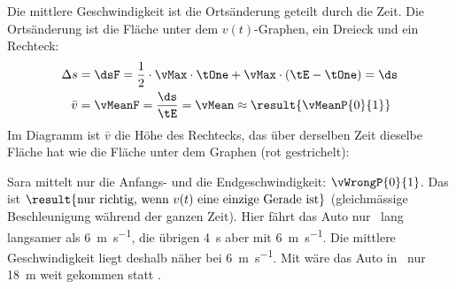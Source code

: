 \begin{abcliste}
\abc Die mittlere Geschwindigkeit ist die Ortsänderung geteilt durch die Zeit. Die Ortsänderung ist die Fläche unter dem $v(t)$-Graphen, ein Dreieck und ein Rechteck:
\begin{align}
 \Delta s &= \dsF = \frac{1}{2}\cdot\vMax\cdot\tOne+\vMax\cdot\left(\tE-\tOne\right) = \ds \\
 \bar v &= \vMeanF = \frac{\ds}{\tE} = \vMean \approx \result{\vMeanP{0}{1}}
\end{align}
Im Diagramm ist $\bar v$ die Höhe des Rechtecks, das über derselben Zeit dieselbe Fläche hat wie die Fläche unter dem Graphen (rot gestrichelt):
\begin{center}
\end{center}
\abc Sara mittelt nur die Anfangs- und die Endgeschwindigkeit: $\vWrongP{0}{1}$. Das ist $\result{\text{nur richtig, wenn } v(t) \text{ eine einzige Gerade ist}}$ (gleichmässige Beschleunigung während der ganzen Zeit). Hier fährt das Auto nur \tOneO\ lang langsamer als \SI{6}{\meter\per\second}, die übrigen \SI{4}{\second} aber mit \SI{6}{\meter\per\second}. Die mittlere Geschwindigkeit liegt deshalb näher bei \SI{6}{\meter\per\second}. Mit  wäre das Auto in \tEO\ nur \SI{18}{\meter} weit gekommen statt .
\end{abcliste}
